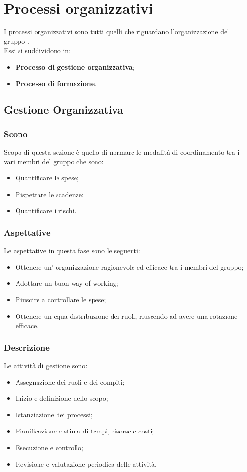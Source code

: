 \section{Processi organizzativi}\label{section:processi_organizzativi}
  I processi organizzativi sono tutti quelli che riguardano l'organizzazione del gruppo \groupName.\\ Essi si suddividono in:
  \begin{itemize}
    \item \textbf{Processo di gestione organizzativa};
    \item \textbf{Processo di formazione}.
  \end{itemize}

  \subsection{Gestione Organizzativa} \label{subsection:gestione_organizzativa}
  \subsubsection {Scopo}
  Scopo di questa sezione è quello di normare le modalità di coordinamento tra i vari membri del gruppo che sono:
  \begin {itemize}
      \item Quantificare le spese;
      \item Rispettare le scadenze;
      \item Quantificare i rischi.
  \end{itemize}
  \subsubsection{Aspettative}
  Le aspettative in questa fase sono le seguenti:
  \begin {itemize}
    \item Ottenere un' organizzazione ragionevole ed efficace tra i membri del gruppo;
    \item Adottare un buon way of working;
    \item Riuscire a controllare le spese;
    \item Ottenere un equa distribuzione dei ruoli, riuscendo ad avere una rotazione efficace.
  \end {itemize}
  \subsubsection{Descrizione}
  Le attività di gestione sono:
  \begin {itemize}
    \item Assegnazione dei ruoli e dei compiti;
    \item Inizio e definizione dello scopo;
    \item Istanziazione dei processi;
    \item Pianificazione e stima di tempi, risorse e costi; 
    \item Esecuzione e controllo;
    \item Revisione e valutazione periodica delle attività.
  \end {itemize}

